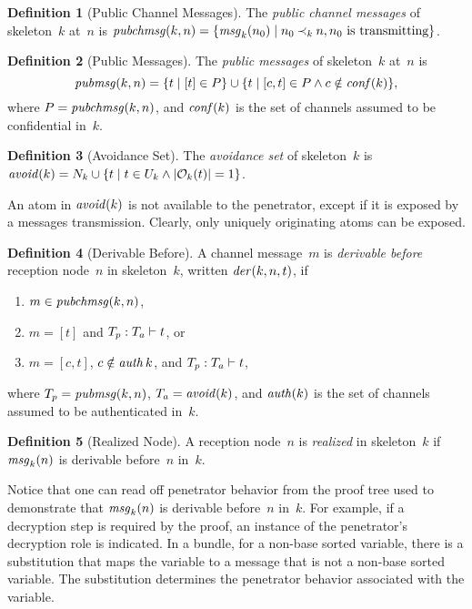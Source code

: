 \documentclass[12pt]{report}
\theoremstyle{definition}
\newtheorem{defn}{Definition}[chapter]
\newcommand{\pubchmsg}{\fn{pubchmsg}}
\newcommand{\pubmsg}{\fn{pubmsg}}
\newcommand{\auth}{\fn{auth}}
\newcommand{\conf}{\fn{conf}}
\newcommand{\avoid}{\fn{avoid}}
\newcommand{\msg}{\fn{msg}}
\begin{document}
\begin{defn}[Public Channel Messages]
The \emph{public channel messages} of
skeleton~$k$ at~$n$ is $\pubchmsg(k,n)=\{\msg_k(n_0)\mid n_0 \kprec{k}
n, n_0\mbox{~is transmitting}\}$.
\end{defn}

\begin{defn}[Public Messages]
The \emph{public messages} of
skeleton~$k$ at~$n$ is \[\pubmsg(k,n)=\{t\mid [t]\in P\}\cup
\{t\mid[c,t]\in P\land c\notin \conf(k)\},\] where $P=\pubchmsg(k, n)$,
and $\conf(k)$ is the set of channels assumed to be confidential in~$k$.

\end{defn}

\begin{defn}[Avoidance Set]\label{def:avoid}
The \emph{avoidance set} of skeleton~$k$ is
$\avoid(k)=N_k\cup\{t\mid t\in U_k\land|\orig_k(t)|=1\}$.
\end{defn}

An atom in $\avoid(k)$ is not available to the penetrator, except
if it is exposed by a messages transmission.  Clearly, only uniquely
originating atoms can be exposed.

\begin{defn}[Derivable Before]\label{def:der}
A channel message~$m$ is \emph{derivable
  before} reception node~$n$ in skeleton~$k$, written
$\fn{der}(k,n,t)$, if
\begin{enumerate}
\item $m\in\pubchmsg(k,n)$,
\item $m=[t]$ and $\der{t}{T_p}{T_a}$, or
\item $m=[c,t]$, $c\notin\auth{k}$, and $\der{t}{T_p}{T_a}$,
\end{enumerate}
where $T_p=\pubmsg(k,n)$, $T_a=\avoid(k)$, and $\auth(k)$ is the set
of channels assumed to be authenticated in~$k$.
\end{defn}

\begin{defn}[Realized Node]
A reception node~$n$ is \emph{realized} in skeleton~$k$ if
$\msg_k(n)$ is derivable before~$n$ in~$k$.
\end{defn}

Notice that one can read off penetrator behavior from the proof tree
used to demonstrate that $\msg_k(n)$ is derivable before~$n$
in~$k$.  For example, if a decryption step is required by the proof,
an instance of the penetrator's decryption role is indicated.  In a
bundle, for a non-base sorted variable, there is a substitution that
maps the variable to a message that is not a non-base sorted variable.
The substitution determines the penetrator behavior associated with
the variable.
\end{document}
